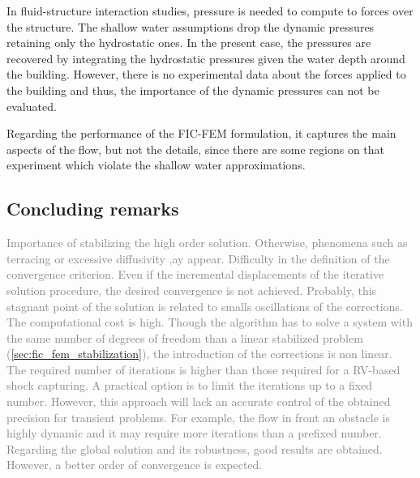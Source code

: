 In fluid-structure interaction studies, pressure is needed to compute to forces over the structure. The shallow water assumptions drop the dynamic pressures retaining only the hydrostatic ones. In the present case, the pressures are recovered by integrating the hydrostatic pressures given the water depth around the building. However, there is no experimental data about the forces applied to the building and thus, the importance of the dynamic pressures can not be evaluated.


Regarding the performance of the FIC-FEM formulation, it captures the main aspects of the flow, but not the details, since there are some regions on that experiment which violate the shallow water approximations.








\subsection{Concluding remarks}




\textcolor{gray}{
Importance of stabilizing the high order solution. Otherwise, phenomena such as terracing or excessive diffusivity ,ay appear.
Difficulty in the definition of the convergence criterion. Even if the incremental displacements of the iterative solution procedure, the desired convergence is not achieved. Probably, this stagnant point of the solution is related to smalls oscillations of the corrections.
The computational cost is high. Though the algorithm has to solve a system with the same number of degrees of freedom than a linear stabilized problem (\ref{sec:fic_fem_stabilization}), the introduction of the corrections is non linear. The required number of iterations is higher than those required for a RV-based shock capturing. A practical option is to limit the iterations up to a fixed number. However, this approach will lack an accurate control of the obtained precision for transient problems. For example, the flow in front an obstacle is highly dynamic and it may require more iterations than a prefixed number.
Regarding the global solution and its robustness, good results are obtained. However, a better order of convergence is expected.
}




